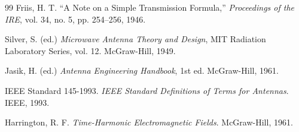 \documentclass[a4paper, 11pt]{article}
\begin{document}
\begin{thebibliography}{99}
Friis, H. T. ``A Note on a Simple Transmission Formula,'' \textit{Proceedings of the IRE}, vol. 34, no. 5, pp. 254--256, 1946.

Silver, S. (ed.) \textit{Microwave Antenna Theory and Design}, MIT Radiation Laboratory Series, vol. 12. McGraw-Hill, 1949.

Jasik, H. (ed.) \textit{Antenna Engineering Handbook}, 1st ed. McGraw-Hill, 1961.

IEEE Standard 145-1993. \textit{IEEE Standard Definitions of Terms for Antennas}. IEEE, 1993.

Harrington, R. F. \textit{Time-Harmonic Electromagnetic Fields}. McGraw-Hill, 1961.

\end{thebibliography}
\end{document}
